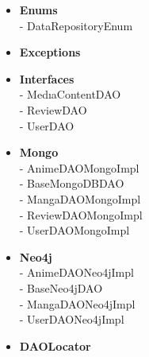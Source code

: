 \begin{itemize}
    \item \textbf{Enums} \\
    - DataRepositoryEnum
    \item \textbf{Exceptions}
    \item \textbf{Interfaces} \\
    - MedıaContentDAO \\
    - ReviewDAO \\
    - UserDAO 
    \item \textbf{Mongo} \\
    - AnimeDAOMongoImpl \\
    - BaseMongoDBDAO \\
    - MangaDAOMongoImpl \\
    - ReviewDAOMongoImpl \\
    - UserDAOMongoImpl 
    \item \textbf{Neo4j} \\
    - AnimeDAONeo4jImpl \\
    - BaseNeo4jDAO \\
    - MangaDAONeo4jImpl \\
    - UserDAONeo4jImpl 
    \item \textbf{DAOLocator}
\end{itemize}

\vspace{\baselineskip}


